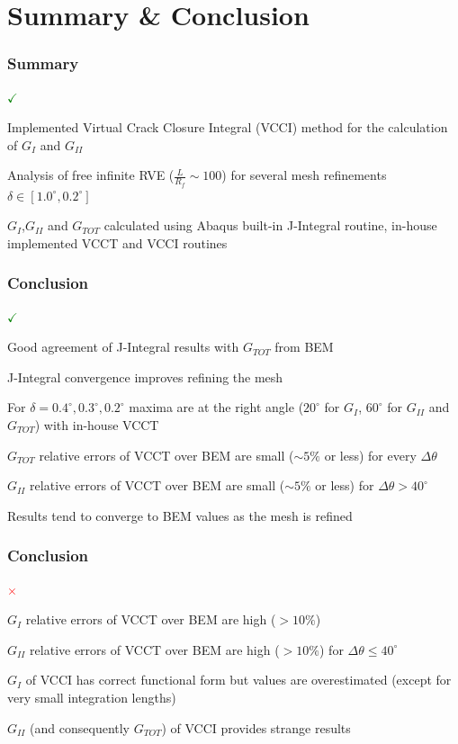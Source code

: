 \documentclass[first,firstsupp,lastsupp,handout,last,hyperref,table]{ETHclass}
\begin{document}
\section{Summary \& Conclusion}

\begin{frame}
\frametitle{\small Summary}
\vspace{-0.5cm}
\centering
\begin{list}{\Large\textcolor{green}{$\mathbf{\checkmark}$}}{}  
\item Implemented Virtual Crack Closure Integral (VCCI) method for the calculation of $G_{I}$ and $G_{II}$
\item Analysis of free infinite RVE ($\frac{L}{R_{f}}\sim 100$) for several mesh refinements $\delta\in\left[1.0^{\circ},0.2^{\circ}\right]$
\item $G_{I}$,$G_{II}$ and $G_{TOT}$ calculated using Abaqus built-in J-Integral routine, in-house implemented VCCT and VCCI routines
\end{list}
\end{frame}

\begin{frame}
\frametitle{\small Conclusion}
\vspace{-0.5cm}
\centering
\begin{list}{\Large\textcolor{green}{$\mathbf{\checkmark}$}}{}  
\item Good agreement of J-Integral results with $G_{TOT}$ from BEM
\item J-Integral convergence improves refining the mesh
\item For $\delta=0.4^{\circ},0.3^{\circ},0.2^{\circ}$ maxima are at the right angle ($20^{\circ}$ for $G_{I}$, $60^{\circ}$ for $G_{II}$ and $G_{TOT}$) with in-house VCCT
\item $G_{TOT}$ relative errors of VCCT over BEM are small ($\sim 5\%$ or less) for every $\Delta\theta$
\item $G_{II}$ relative errors of VCCT over BEM are small ($\sim 5\%$ or less) for $\Delta\theta > 40^{\circ}$
\item Results tend to converge to BEM values as the mesh is refined
\end{list}
\end{frame}

\begin{frame}
\frametitle{\small Conclusion}
\vspace{-0.5cm}
\centering
\begin{list}{\Huge\textcolor{red}{$\mathbf{\times}$}}{}  
\item $G_{I}$ relative errors of VCCT over BEM are high ($>10\%$)
\item $G_{II}$ relative errors of VCCT over BEM are high ($>10\%$) for $\Delta\theta \leq 40^{\circ}$
\item $G_{I}$ of VCCI has correct functional form but values are overestimated (except for very small integration lengths)
\item $G_{II}$ (and consequently $G_{TOT}$) of VCCI provides strange results
\end{list}
\end{frame}
\end{document}
